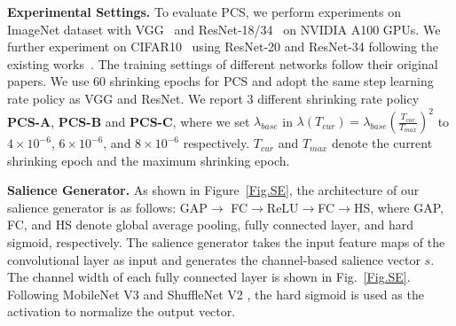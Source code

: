 \documentclass[lettersize,journal]{IEEEtran}
\begin{document}
\textbf{Experimental Settings.} To evaluate PCS, we perform experiments on ImageNet dataset with VGG~\cite{simonyan2014very} and ResNet-18/34~\cite{he2016deep} on NVIDIA A100 GPUs. We further experiment on CIFAR10~\cite{krizhevsky2009learning} using ResNet-20 and ResNet-34 following the existing works~\cite{he2018soft, he2019filter, tang2021manifold}. The training settings of different networks follow their original papers. We use 60 shrinking epochs for PCS and adopt the same step learning rate policy as VGG and ResNet. We report 3 different shrinking rate policy \textbf{PCS-A}, \textbf{PCS-B} and \textbf{PCS-C}, where we set $\lambda_{base}$ in  $\lambda(T_{cur})=\lambda_{base}(\frac{T_{cur}}{T_{max}})^2$ to $4\times 10^{-6}$, $6\times 10^{-6}$, and $8\times 10^{-6}$ respectively. $T_{cur}$ and $T_{max}$ denote the current shrinking epoch and the maximum shrinking epoch. 

\textbf{Salience Generator.} 
As shown in Figure~\ref{Fig.SE}, the architecture of our salience generator is as follows: GAP$\longrightarrow$ FC$\longrightarrow$ReLU$\longrightarrow$FC$\longrightarrow$HS, where GAP, FC, and HS denote global average pooling, fully connected layer, and hard sigmoid, respectively. The salience generator takes the input feature maps of the convolutional layer as input and generates the channel-based salience vector $s$. The channel width of each fully connected layer is shown in Fig.~\ref{Fig.SE}. 
Following MobileNet V3 \cite{howard2019searching} and ShuffleNet V2 \cite{ma2018shufflenet}, the hard sigmoid is used as the activation to normalize the output vector. 
\end{document}
